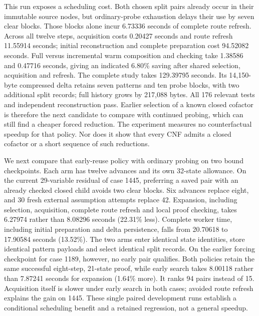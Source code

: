 \documentclass[11pt,a4paper]{article}
\numberwithin{equation}{section}
\theoremstyle{plain}
\theoremstyle{definition}
\theoremstyle{remark}
\begin{document}
This run exposes a scheduling cost. Both chosen split pairs already occur in their immutable source nodes, but ordinary-probe exhaustion delays their use by seven clear blocks. Those blocks alone incur 6.73336 seconds of complete route refresh. Across all twelve steps, acquisition costs 0.20427 seconds and route refresh 11.55914 seconds; initial reconstruction and complete preparation cost 94.52082 seconds. Full versus incremental warm composition and checking take 1.38586 and 0.47716 seconds, giving an indicated 6.80\% saving after shared selection, acquisition and refresh. The complete study takes 129.39795 seconds. Its 14,150-byte compressed delta retains seven patterns and ten probe blocks, with two additional split records; full history grows by 217,088 bytes. All 176 relevant tests and independent reconstruction pass. Earlier selection of a known closed cofactor is therefore the next candidate to compare with continued probing, which can still find a cheaper forced reduction. The experiment measures no counterfactual speedup for that policy. Nor does it show that every CNF admits a closed cofactor or a short sequence of such reductions.

We next compare that early-reuse policy with ordinary probing on two bound checkpoints. Each arm has twelve advances and its own 32-state allowance. On the current 29-variable residual of case 1445, preferring a saved pair with an already checked closed child avoids two clear blocks. Six advances replace eight, and 30 fresh external assumption attempts replace 42. Expansion, including selection, acquisition, complete route refresh and local proof checking, takes 6.27974 rather than 8.08296 seconds (22.31\% less). Complete worker time, including initial preparation and delta persistence, falls from 20.70618 to 17.90584 seconds (13.52\%). The two arms enter identical state identities, store identical pattern payloads and select identical split records. On the earlier forcing checkpoint for case 1189, however, no early pair qualifies. Both policies retain the same successful eight-step, 21-state proof, while early search takes 8.00118 rather than 7.87241 seconds for expansion (1.64\% more). It ranks 94 pairs instead of 15. Acquisition itself is slower under early search in both cases; avoided route refresh explains the gain on 1445. These single paired development runs establish a conditional scheduling benefit and a retained regression, not a general speedup.
\end{document}
